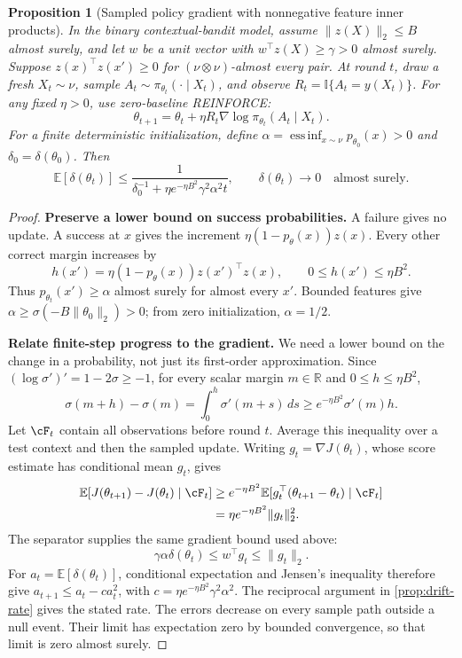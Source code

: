 \documentclass[11pt,twoside]{article}
\newcommand{\E}{\mathbb E}
\newcommand{\I}{\mathbb I}
\newcommand{\R}{\mathbb R}
\newtheorem{proposition}[theorem]{Proposition}
\theoremstyle{definition}
\theoremstyle{remark}
\begin{document}
\begin{proposition}[Sampled policy gradient with nonnegative feature inner products]
\label{prop:nonnegative-pg}
In the binary contextual-bandit model, assume
$\|z(X)\|_2\le B$ almost surely, and let $w$ be a unit vector with
$w^\top z(X)\ge\gamma>0$ almost surely. Suppose
$z(x)^\top z(x')\ge0$ for $(\nu\otimes\nu)$-almost every pair.
At round $t$, draw a fresh $X_t\sim\nu$, sample
$A_t\sim\pi_{\theta_t}(\cdot\mid X_t)$, and observe
$R_t=\I\{A_t=y(X_t)\}$. For any fixed $\eta>0$, use zero-baseline REINFORCE:
\[
 \theta_{t+1}=\theta_t+\eta R_t
 \nabla\log\pi_{\theta_t}(A_t\mid X_t).
\]
For a finite deterministic initialization, define
$\alpha=\operatorname*{ess\,inf}_{x\sim\nu}p_{\theta_0}(x)>0$ and
$\delta_0=\delta(\theta_0)$. Then
\[
 \E[\delta(\theta_t)]\le
 \frac{1}{\delta_0^{-1}+\eta e^{-\eta B^2}\gamma^2\alpha^2t},
 \qquad \delta(\theta_t)\longrightarrow0\quad\text{almost surely}.
\]
\end{proposition}
\begin{proof}
\textbf{Preserve a lower bound on success probabilities.}
A failure gives no update. A success at $x$ gives the increment
$\eta(1-p_\theta(x))z(x)$. Every other correct margin increases by
\[
 h(x')=\eta(1-p_\theta(x))z(x')^\top z(x),
 \qquad 0\le h(x')\le\eta B^2.
\]
Thus $p_{\theta_t}(x')\ge\alpha$ almost surely for almost every $x'$.
Bounded features give
$\alpha\ge\sigma(-B\|\theta_0\|_2)>0$; from zero initialization,
$\alpha=1/2$.

\textbf{Relate finite-step progress to the gradient.}
We need a lower bound on the change in a probability, not just its
first-order approximation. Since
$(\log\sigma')'=1-2\sigma\ge-1$, for every scalar margin $m\in\R$
and $0\le h\le\eta B^2$,
\[
 \sigma(m+h)-\sigma(m)
 =\int_0^h\sigma'(m+s)\,ds
 \ge e^{-\eta B^2}\sigma'(m)h.
\]
Let $\cF_t$ contain all observations before round $t$.
Average this inequality over a test context and then the sampled update.
Writing $g_t=\nabla J(\theta_t)$, whose score estimate has conditional
mean $g_t$, gives
\[
 \begin{aligned}
 \E[J(\theta_{t+1})-J(\theta_t)\mid\cF_t]
 &\ge e^{-\eta B^2}
 \E[g_t^\top(\theta_{t+1}-\theta_t)\mid\cF_t]\\
 &=\eta e^{-\eta B^2}\|g_t\|_2^2.
 \end{aligned}
\]
The separator supplies the same gradient bound used above:
\[
 \gamma\alpha\delta(\theta_t)
 \le w^\top g_t\le\|g_t\|_2.
\]
For $a_t=\E[\delta(\theta_t)]$, conditional expectation and Jensen's
inequality therefore give
$a_{t+1}\le a_t-ca_t^2$, with
$c=\eta e^{-\eta B^2}\gamma^2\alpha^2$.
The reciprocal argument in \cref{prop:drift-rate} gives the stated rate.
The errors decrease on every sample path outside a null event.
Their limit has expectation zero by bounded convergence, so that limit
is zero almost surely.
\end{proof}
\end{document}
